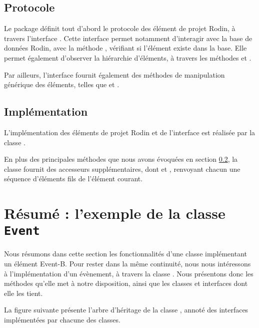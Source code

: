 \subsection{Protocole}

Le package  définit tout d'abord le protocole des élément de projet Rodin, à travers l'interface .
Cette interface permet notamment d'interagir avec la base de données Rodin, avec la méthode , vérifiant si l'élément existe dans la base.
Elle permet également d'observer la hiérarchie d'éléments, à travers les méthodes  et .

Par ailleurs, l'interface  fournit également des méthodes de manipulation générique des éléments, telles que  et %
.


\subsection{Implémentation}\label{sec:rodinProjectElementProtocol}

L'implémentation des éléments de projet Rodin et de l'interface  est réalisée par la classe .

En plus des principales méthodes que nous avons évoquées en section \ref{sec:rodinProjectElementProtocol}, la classe  fournit %
des accesseurs supplémentaires, dont  et , renvoyant chacun une séquence d'éléments fils de l'élément courant.


\section{Résumé : l'exemple de la classe \texttt{Event}}\label{sec:rodinApiSummaryEvent}

Nous résumons dans cette section les fonctionnalités d'une classe implémentant un élément Event-B.
Pour rester dans la même continuité, nous nous intéressons à l'implémentation d'un évènement, à travers la classe .
Nous présentons donc les méthodes qu'elle met à notre disposition, ainsi que les classes et interfaces dont elle les tient.

La figure suivante présente l'arbre d'héritage de la classe , annoté des interfaces implémentées par chacune des classes.

